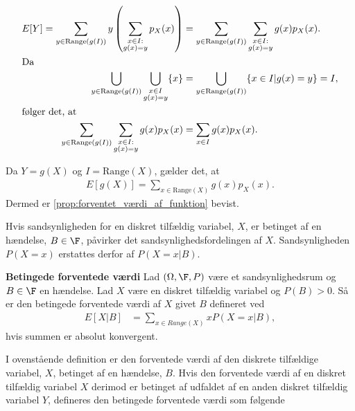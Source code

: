 \begin{bev}
\begin{align}
    E[Y] = \sum_{y \in \text{Range}\left(g(I)\right)} y\left( \sum_{\substack{x \in I:\\ g(x) =y}}p_X(x) \right)
    &=\sum_{y \in \text{Range}\left(g(I)\right)}\sum_{\substack{x \in I:\\ g(x) =y}} g(x) p_X(x). \nonumber\\
    \intertext{Da}
    \bigcup_{y\in \text{Range}\left(g(I)\right)}\bigcup_{\substack{x\in I\\g(x)=y}}\{x\}&=\bigcup_{y\in\text{Range}\left(g(I)\right)}\{x\in I|g(x)=y\} = I,\nonumber\\
    \intertext{følger det, at}
    \sum_{y \in \text{Range}\left(g(I)\right)}\sum_{\substack{x \in I:\\ g(x) =y}} g(x) p_X(x)&=\sum_{x\in I}g(x)p_X(x). \nonumber
\end{align}

Da $Y=g(X)$ og $I = \text{Range}(X)$, gælder det, at
\begin{align*}
    E\left[g(X)\right]=\sum_{x\in \text{Range}(X)}g(x)p_X(x).
\end{align*}
Dermed er \autoref{prop:forventet_værdi_af_funktion} bevist.
\end{bev}

Hvis sandsynligheden for en diskret tilfældig variabel, $X$, er betinget af en hændelse, $B\in\F$, påvirker det sandsynlighedsfordelingen af $X$. Sandsynligheden $P(X=x)$ erstattes derfor af $P(X=x|B)$.

\begin{minipage}\textwidth
\begin{defn}\textbf{Betingede forventede værdi}\label{def:betinget_forventet_værdi} %
\newline
Lad $(\Omega, \F, P)$ være et sandsynlighedsrum og $B\in\F$ en hændelse. Lad $X$ være en diskret tilfældig variabel og $P(B)>0$. Så er den betingede forventede værdi af $X$ givet $B$ defineret ved 
\begin{align*}
    E[X|B]&=\sum_{x\in Range(X)}xP(X=x|B),
\end{align*}
hvis summen er absolut konvergent.
\end{defn}
\end{minipage}

I ovenstående definition er den forventede værdi af den diskrete tilfældige variabel, $X$, betinget af en hændelse, $B$. Hvis den forventede værdi af en diskret tilfældig variabel $X$ derimod er betinget af udfaldet af en anden diskret tilfældig variabel $Y$, defineres den betingede forventede værdi som følgende

